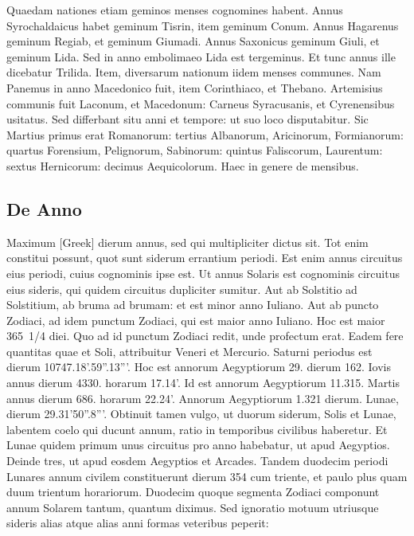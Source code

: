 Quaedam nationes etiam geminos menses cognomines habent.
Annus Syrochaldaicus habet geminum Tisrin, item geminum Conum.
Annus Hagarenus geminum Regiab, et geminum Giumadi.
Annus Saxonicus geminum Giuli, et geminum Lida.
Sed in
anno embolimaeo Lida est tergeminus.
Et tunc annus ille dicebatur
Trilida.
Item, diversarum nationum iidem menses communes.
Nam
Panemus in anno Macedonico fuit, item Corinthiaco, et Thebano.
Artemisius communis fuit Laconum, et Macedonum: Carneus Syracusanis,
et Cyrenensibus usitatus.
Sed differbant situ anni et tempore:
ut suo loco disputabitur.
Sic Martius primus erat Romanorum:
tertius Albanorum, Aricinorum, Formianorum: quartus Forensium,
Pelignorum, Sabinorum: quintus Faliscorum, Laurentum:
sextus Hernicorum: decimus Aequicolorum.
Haec in genere
de mensibus.

\subsection{De Anno}

Maximum \textgreek{[Greek]}
 dierum annus, sed qui multipliciter dictus
sit.
Tot enim constitui possunt, quot sunt siderum errantium
periodi.
Est enim annus circuitus eius periodi, cuius cognominis
ipse est.
Ut annus Solaris est cognominis circuitus eius sideris,
qui quidem circuitus dupliciter sumitur.
Aut ab Solstitio ad Solstitium,
ab bruma ad brumam: et est minor anno Iuliano.
Aut ab puncto Zodiaci,
ad idem punctum Zodiaci, qui est maior anno Iuliano.
Hoc est maior 365~1/4 diei.
Quo ad id punctum Zodiaci redit, unde profectum
erat.
Eadem fere quantitas quae et Soli, attribuitur Veneri et Mercurio.
Saturni periodus est dierum 10747.18'.59''.13'''.
Hoc est annorum
Aegyptiorum 29. dierum 162.
Iovis annus dierum 4330. horarum 17.14'.
Id est annorum Aegyptiorum 11.315.
Martis annus dierum
686. horarum 22.24'.
Annorum Aegyptiorum 1.321 dierum.
Lunae,
dierum 29.31'50''.8'''.
Obtinuit tamen vulgo, ut duorum siderum,
Solis et Lunae, labentem coelo qui ducunt annum, ratio in temporibus
civilibus haberetur.
Et Lunae quidem primum unus circuitus
pro anno habebatur, ut apud Aegyptios.
Deinde tres, ut apud eosdem
Aegyptios et Arcades.
Tandem duodecim periodi Lunares annum
civilem constituerunt dierum 354 cum triente, et paulo plus quam
duum trientum horariorum.
Duodecim quoque segmenta Zodiaci
componunt annum Solarem tantum, quantum diximus.
Sed ignoratio
motuum utriusque sideris alias atque alias anni formas veteribus
peperit:

